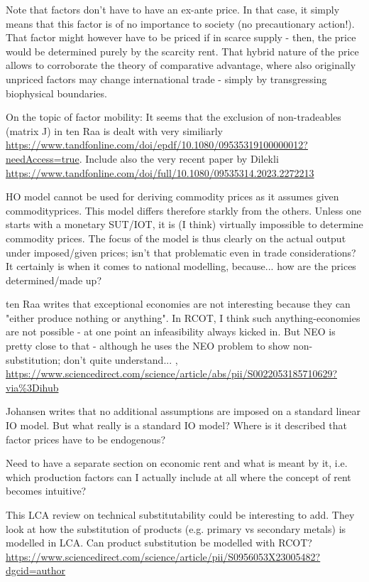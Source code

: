 \documentclass{article}
\begin{document}
\begin{refsection}
Note that factors don't have to have an ex-ante price. In that case, it simply means that this factor is of no importance to society (no precautionary action!). That factor might however have to be priced if in scarce supply - then, the price would be determined purely by the scarcity rent. That hybrid nature of the price allows to corroborate the theory of comparative advantage, where also originally unpriced factors may change international trade - simply by transgressing biophysical boundaries.

On the topic of factor mobility: It seems that the exclusion of non-tradeables (matrix J) in ten Raa is dealt with very similiarly \url{https://www.tandfonline.com/doi/epdf/10.1080/09535319100000012?needAccess=true}. Include also the very recent paper by Dilekli \url{https://www.tandfonline.com/doi/full/10.1080/09535314.2023.2272213}

HO model cannot be used for deriving commodity prices as it assumes given commodityprices. This model differs therefore starkly from the others. Unless one starts with a monetary SUT/IOT, it is (I think) virtually impossible to determine commodity prices. The focus of the model is thus clearly on the actual output under imposed/given prices; isn't that problematic even in trade considerations? It certainly is when it comes to national modelling, because... how are the prices determined/made up?

ten Raa writes that exceptional economies are not interesting because they can "either produce nothing or anything". In RCOT, I think such anything-economies are not possible - at one point an infeasibility always kicked in. But NEO is pretty close to that - although he uses the NEO problem to show non-substitution; don't quite understand... , \url{https://www.sciencedirect.com/science/article/abs/pii/S0022053185710629?via%3Dihub}

Johansen writes that no additional assumptions are imposed on a standard linear IO model. But what really is a standard IO model? Where is it described that factor prices have to be endogenous?

Need to have a separate section on economic rent and what is meant by it, i.e. which production factors can I actually include at all where the concept of rent becomes intuitive?

This LCA review on technical substitutability could be interesting to add. They look at how the substitution of products (e.g. primary vs secondary metals) is modelled in LCA. Can product substitution be modelled with RCOT? \url{https://www.sciencedirect.com/science/article/pii/S0956053X23005482?dgcid=author}


\end{refsection}
\end{document}
